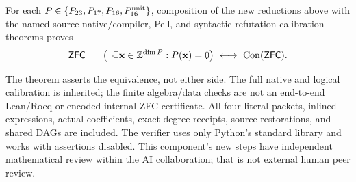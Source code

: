 \begin{theorem}
For each $P\in\{P_{23},P_{17},P_{16},P_{16}^{\rm unit}\}$, composition of the new
reductions above with the named source native/compiler, Pell, and
syntactic-refutation calibration theorems proves
\[
 \mathsf{ZFC}\ \vdash\
  \bigl(\neg\exists\mathbf x\in\mathbb Z^{\dim P}:P(\mathbf x)=0\bigr)
  \ \longleftrightarrow\ \operatorname{Con}(\mathsf{ZFC}).
\]
\end{theorem}

The theorem asserts the equivalence, not either side. The full native and
logical calibration is inherited; the finite algebra/data checks are not an
end-to-end Lean/Rocq or encoded internal-ZFC certificate. All four literal
packets, inlined expressions, actual coefficients, exact degree receipts,
source restorations, and shared DAGs are included. The verifier uses only
Python's standard library and works with assertions disabled. This component's
new steps have independent mathematical review within the AI collaboration;
that is not external human peer review.
